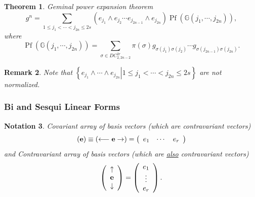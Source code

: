 \documentclass[aps,preprint]{revtex4}%
\newtheorem{theorem}{Theorem}
\newtheorem{notation}[theorem]{Notation}
\newtheorem{remark}[theorem]{Remark}
\begin{document}
\begin{theorem}
Geminal power expansion theorem
\begin{equation}
g^{n}=\sum_{1\leq j_{1}<\cdots<j_{2n}\leq2s}\left(  e_{j_{1}}\wedge e_{j_{2}%
}\cdots e_{j_{2n-1}}\wedge e_{j_{2n}}\right)  \operatorname{Pf}\left(
\mathbb{G}\left(  j_{1},\cdots,j_{2n}\right)  \right)  ,
\end{equation}
where
\begin{equation}
\operatorname{Pf}\left(  \mathbb{G}\left(  j_{1},\cdots,j_{2n}\right)
\right)  =\sum_{\sigma\in DC_{2,2n-2}^{2r}}\pi\left(  \sigma\right)
g_{\sigma\left(  j_{1}\right)  \sigma\left(  j_{2}\right)  }\cdots
g_{\sigma\left(  j_{2n-1}\right)  \sigma\left(  j_{2n}\right)  }.
\end{equation}

\end{theorem}

\begin{remark}
Note that $\left\{  \left.  e_{j_{1}}\wedge\cdots\wedge e_{j_{2n}}\right\vert
1\leq j_{1}<\cdots<j_{2n}\leq2s\right\}  $ are not normalized.
\end{remark}

\label{Bi and Sesqui Linear Forms}

\subsubsection{Bi and Sesqui Linear Forms}

\begin{notation}
\emph{Covariant} array of basis vectors (which are \emph{contravariant}
vectors)
\begin{equation}
\left(  \mathbf{e}\right)  \equiv\left(  \longleftarrow\mathbf{e\rightarrow
}\right)  =\left(
\begin{array}
[c]{ccc}%
e_{1} & \cdots & e_{r}%
\end{array}
\right)
\end{equation}
and \emph{Contravariant} array of basis vectors (which are
\underline{\emph{also}}\emph{ contravariant} vectors)%
\begin{equation}
\left(
\begin{array}
[c]{c}%
\uparrow\\
\mathbf{e}\\
\downarrow
\end{array}
\right)  =\left(
\begin{array}
[c]{c}%
e_{1}\\
\vdots\\
e_{r}%
\end{array}
\right)  .
\end{equation}

\end{notation}
\end{document}
